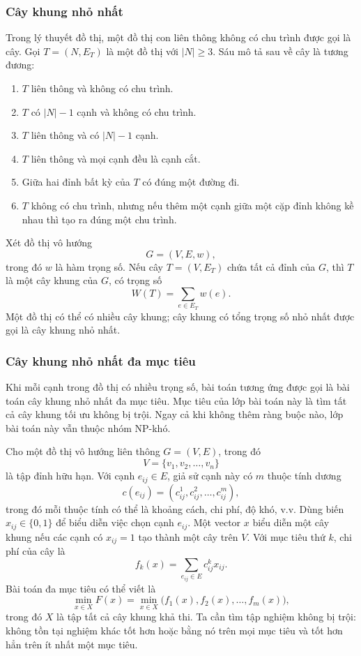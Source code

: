 \documentclass[11pt]{article}
\begin{document}
\subsubsection{Cây khung nhỏ nhất}

Trong lý thuyết đồ thị, một đồ thị con liên thông không có chu trình được gọi
là cây. Gọi \(T=(N,E_T)\) là một đồ thị với \(|N|\ge 3\). Sáu mô tả sau về cây
là tương đương:
\begin{enumerate}
  \item \(T\) liên thông và không có chu trình.
  \item \(T\) có \(|N|-1\) cạnh và không có chu trình.
  \item \(T\) liên thông và có \(|N|-1\) cạnh.
  \item \(T\) liên thông và mọi cạnh đều là cạnh cắt.
  \item Giữa hai đỉnh bất kỳ của \(T\) có đúng một đường đi.
  \item \(T\) không có chu trình, nhưng nếu thêm một cạnh giữa một cặp đỉnh
  không kề nhau thì tạo ra đúng một chu trình.
\end{enumerate}

Xét đồ thị vô hướng
\[
  G=(V,E,w),
\]
trong đó \(w\) là hàm trọng số. Nếu cây \(T=(V,E_T)\) chứa tất cả đỉnh của
\(G\), thì \(T\) là một cây khung của \(G\), có trọng số
\[
  W(T)=\sum_{e\in E_T} w(e).
\]
Một đồ thị có thể có nhiều cây khung; cây khung có tổng trọng số nhỏ nhất được
gọi là cây khung nhỏ nhất.

\subsubsection{Cây khung nhỏ nhất đa mục tiêu}

Khi mỗi cạnh trong đồ thị có nhiều trọng số, bài toán tương ứng được gọi là
bài toán cây khung nhỏ nhất đa mục tiêu. Mục tiêu của lớp bài toán này là tìm
tất cả cây khung tối ưu không bị trội. Ngay cả khi không thêm ràng buộc nào,
lớp bài toán này vẫn thuộc nhóm NP-khó.

Cho một đồ thị vô hướng liên thông \(G=(V,E)\), trong đó
\[
  V=\{v_1,v_2,\ldots,v_n\}
\]
là tập đỉnh hữu hạn. Với cạnh \(e_{ij}\in E\), giả sử cạnh này có \(m\) thuộc
tính dương
\[
  c(e_{ij})=(c^1_{ij},c^2_{ij},\ldots,c^m_{ij}),
\]
trong đó mỗi thuộc tính có thể là khoảng cách, chi phí, độ khó, v.v. Dùng biến
\(x_{ij}\in\{0,1\}\) để biểu diễn việc chọn cạnh \(e_{ij}\). Một vector \(x\)
biểu diễn một cây khung nếu các cạnh có \(x_{ij}=1\) tạo thành một cây trên
\(V\). Với mục tiêu thứ \(k\), chi phí của cây là
\[
  f_k(x)=\sum_{e_{ij}\in E} c^k_{ij}x_{ij}.
\]
Bài toán đa mục tiêu có thể viết là
\[
  \min_{x\in X} F(x)
  =
  \min_{x\in X} \bigl(f_1(x),f_2(x),\ldots,f_m(x)\bigr),
\]
trong đó \(X\) là tập tất cả cây khung khả thi. Ta cần tìm tập nghiệm không bị
trội: không tồn tại nghiệm khác tốt hơn hoặc bằng nó trên mọi mục tiêu và tốt
hơn hẳn trên ít nhất một mục tiêu.
\end{document}

